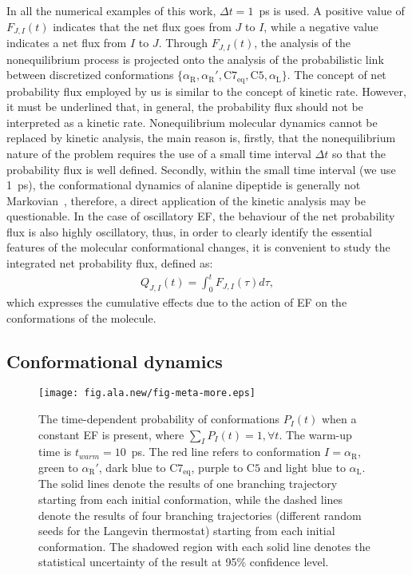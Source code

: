 \documentclass[a4paper,preprint,unsortedaddress,onecolumn]{revtex4-1}
\newcommand{\recheck}[1]{{\color{red} #1}}
\newcommand{\confaa}[0]{{\alpha_{\textrm{R}}}}
\newcommand{\confab}[0]{{\alpha_{\textrm{R}}'}}
\newcommand{\confba}[0]{{\textrm{C}7_{\textrm{eq}}}}
\newcommand{\confbb}[0]{{\textrm{C}5}}
\newcommand{\confc}[0]{{\alpha_{\textrm{L}}}}
\begin{document}
\recheck{In all the numerical examples of this work, $\Delta t = 1$~ps is used}.
A positive value of $F_{J,I}(t)$ indicates that the
net flux goes from $J$ to $I$,
while a negative value indicates a net flux from $I$ to $J$.
Through $F_{J,I}(t)$, the analysis of the nonequilibrium process 
is projected onto the analysis of the probabilistic link between discretized conformations $\{\confaa, \confab, \confba, \confbb, \confc\}$.
\recheck{ The concept of net probability flux employed by us is similar to the
  concept of kinetic rate.  However, it must be underlined that, in general, the
  probability flux should not be interpreted as a kinetic rate.
  Nonequilibrium molecular dynamics cannot be replaced by 
  kinetic analysis, the main reason is, firstly, that the nonequilibrium
  nature of the problem requires the use of a small time interval $\Delta t$ so that the probability flux is well defined.
  Secondly, within the small
  time interval (we use 1~ps), the conformational
  dynamics of alanine dipeptide is generally not Markovian~\cite{schuette2011markov, prinz2011markov},
  therefore, a direct application of the kinetic
  analysis may be questionable.}
In the case of oscillatory EF, the behaviour of the net probability flux is also highly oscillatory, thus, in order to clearly identify the essential features of the molecular conformational changes, it is convenient to study the integrated net probability flux, defined as:
\begin{align}\label{eqn:tmp7a}
  Q_{J,I} (t) = \int_0^t F_{J,I}(\tau)d \tau,
\end{align}
which expresses the cumulative effects due to the action of EF on the conformations of the molecule.


\subsection{Conformational dynamics}


\begin{figure}
  \centering
  \texttt{[image: fig.ala.new/fig-meta-more.eps]}
  \caption{The time-dependent probability of conformations $P_I(t)$ 
    when a constant EF is present, where $\sum_I P_I(t) = 1, \forall t$.
    The warm-up time is $t_{warm} = 10$~ps. The red line refers to conformation $I = \confaa$,
    green to $\confab$, dark blue to $\confba$, purple to $\confbb$ and light blue
    to $\confc$. \recheck{
      The solid lines denote the results of one branching trajectory
      starting from each initial conformation, while the dashed lines denote
      the results of four branching trajectories (different random seeds for the Langevin thermostat) starting from each initial
      conformation.
      The shadowed region with each solid line denotes the
      statistical uncertainty of the result at 95\% confidence level.
    }
  }
  \label{fig:tmp5}
\end{figure}
\end{document}
